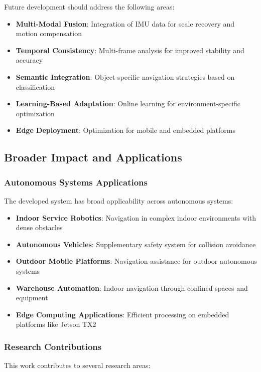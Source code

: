 \documentclass[10pt]{article}
\begin{document}
Future development should address the following areas:

\begin{itemize}
\item \textbf{Multi-Modal Fusion}: Integration of IMU data for scale recovery and motion compensation
\item \textbf{Temporal Consistency}: Multi-frame analysis for improved stability and accuracy
\item \textbf{Semantic Integration}: Object-specific navigation strategies based on classification
\item \textbf{Learning-Based Adaptation}: Online learning for environment-specific optimization
\item \textbf{Edge Deployment}: Optimization for mobile and embedded platforms
\end{itemize}

\subsection{Broader Impact and Applications}

\subsubsection{Autonomous Systems Applications}

The developed system has broad applicability across autonomous systems:

\begin{itemize}
\item \textbf{Indoor Service Robotics}: Navigation in complex indoor environments with dense obstacles
\item \textbf{Autonomous Vehicles}: Supplementary safety system for collision avoidance
\item \textbf{Outdoor Mobile Platforms}: Navigation assistance for outdoor autonomous systems
\item \textbf{Warehouse Automation}: Indoor navigation through confined spaces and equipment
\item \textbf{Edge Computing Applications}: Efficient processing on embedded platforms like Jetson TX2
\end{itemize}

\subsubsection{Research Contributions}

This work contributes to several research areas:
\end{document}
